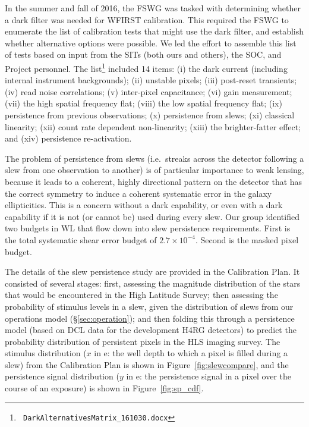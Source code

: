 In the summer and fall of 2016, the FSWG was tasked with determining whether a
dark filter was needed for WFIRST calibration. This required the FSWG to
enumerate the list of calibration tests that might use the dark filter, and
establish whether alternative options were possible. We led the effort to
assemble this list of tests based on input from the SITs (both ours and others),
the SOC, and  Project personnel. The list\footnote{\tt
DarkAlternativesMatrix\_161030.docx} included 14 items: (i) the dark current
(including internal instrument backgrounds); (ii) unstable pixels; (iii)
post-reset transients; (iv) read noise correlations; (v) inter-pixel
capacitance; (vi) gain measurement; (vii) the high spatial frequency flat;
(viii) the low spatial frequency flat; (ix) persistence from previous
observations; (x) persistence from slews; (xi) classical linearity; (xii) count
rate dependent non-linearity; (xiii) the brighter-fatter effect; and (xiv)
persistence re-activation.

The problem of persistence from slews (i.e.\ streaks across the detector
following a slew from one observation to another) is of particular importance to
weak lensing, because it leads to a coherent, highly directional pattern on the
detector that has the correct symmetry to induce a coherent systematic error in
the galaxy ellipticities. This is a concern without a dark capability, or even
with a dark capability if it is not (or cannot be) used during every slew. Our
group identified two budgets in WL that flow down into slew persistence
requirements. First is the total systematic shear error budget of $2.7\times
10^{-4}$. Second is the masked pixel budget.

The details of the slew persistence study are provided in the Calibration Plan.
It consisted of several stages: first, assessing the magnitude distribution of
the stars that would be encountered in the High Latitude Survey; then assessing
the probability of stimulus levels in a slew, given the distribution of slews
from our operations model (\S\ref{sec:operation}); and then folding this through
a persistence model (based on DCL data for the development H4RG detectors) to
predict the probability distribution of persistent pixels in the HLS imaging
survey. The stimulus distribution ($x$ in e: the well depth to which a pixel is
filled during a slew) from the Calibration Plan is shown in
Figure~\ref{fig:slewcompare}, and the persistence signal distribution ($y$ in e:
the persistence signal in a pixel over the course of an exposure) is shown in
Figure~\ref{fig:sp_cdf}.

